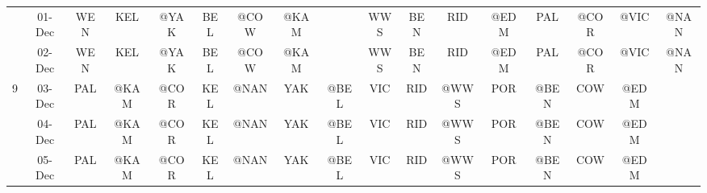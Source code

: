 \begin{table}[htbp]
\begin{tabular}{ccrrrrrrrrrrrrrrr}
          & 01-Dec & \multicolumn{1}{c}{WEN} & \multicolumn{1}{c}{KEL} & \multicolumn{1}{c}{@YAK} & \multicolumn{1}{c}{BEL} & \multicolumn{1}{c}{\cellcolor[rgb]{ .588,  .588,  .588}@COW} & \multicolumn{1}{c}{@KAM} &       & \multicolumn{1}{c}{\cellcolor[rgb]{ 1,  .6,  .8}WWS} & \multicolumn{1}{c}{BEN} & \multicolumn{1}{c}{\cellcolor[rgb]{ 1,  .6,  .8}RID} & \multicolumn{1}{c}{@EDM} & \multicolumn{1}{c}{PAL} & \multicolumn{1}{c}{@COR} & \multicolumn{1}{c}{\cellcolor[rgb]{ .588,  .588,  .588}@VIC} & \multicolumn{1}{c}{@NAN} \\
          & 02-Dec & \multicolumn{1}{c}{WEN} & \multicolumn{1}{c}{KEL} & \multicolumn{1}{c}{@YAK} & \multicolumn{1}{c}{BEL} & \multicolumn{1}{c}{\cellcolor[rgb]{ .588,  .588,  .588}@COW} & \multicolumn{1}{c}{@KAM} &       & \multicolumn{1}{c}{\cellcolor[rgb]{ 1,  .6,  .8}WWS} & \multicolumn{1}{c}{BEN} & \multicolumn{1}{c}{\cellcolor[rgb]{ 1,  .6,  .8}RID} & \multicolumn{1}{c}{@EDM} & \multicolumn{1}{c}{PAL} & \multicolumn{1}{c}{@COR} & \multicolumn{1}{c}{\cellcolor[rgb]{ .588,  .588,  .588}@VIC} & \multicolumn{1}{c}{@NAN} \\
    9     & 03-Dec & \multicolumn{1}{c}{PAL} & \multicolumn{1}{c}{@KAM} & \multicolumn{1}{c}{@COR} & \multicolumn{1}{c}{KEL} & \multicolumn{1}{c}{\cellcolor[rgb]{ .588,  .588,  .588}@NAN} & \multicolumn{1}{c}{YAK} & \multicolumn{1}{c}{@BEL} & \multicolumn{1}{c}{VIC} & \multicolumn{1}{c}{RID} & \multicolumn{1}{c}{\cellcolor[rgb]{ .588,  .588,  .588}@WWS} & \multicolumn{1}{c}{POR} & \multicolumn{1}{c}{@BEN} & \multicolumn{1}{c}{COW} & \multicolumn{1}{c}{\cellcolor[rgb]{ .588,  .588,  .588}@EDM} & \cellcolor[rgb]{ 1,  .6,  .8} \\
          & 04-Dec & \multicolumn{1}{c}{PAL} & \multicolumn{1}{c}{@KAM} & \multicolumn{1}{c}{@COR} & \multicolumn{1}{c}{KEL} & \multicolumn{1}{c}{\cellcolor[rgb]{ .588,  .588,  .588}@NAN} & \multicolumn{1}{c}{YAK} & \multicolumn{1}{c}{@BEL} & \multicolumn{1}{c}{VIC} & \multicolumn{1}{c}{RID} & \multicolumn{1}{c}{\cellcolor[rgb]{ .588,  .588,  .588}@WWS} & \multicolumn{1}{c}{POR} & \multicolumn{1}{c}{@BEN} & \multicolumn{1}{c}{COW} & \multicolumn{1}{c}{\cellcolor[rgb]{ .588,  .588,  .588}@EDM} & \cellcolor[rgb]{ 1,  .6,  .8} \\
          & 05-Dec & \multicolumn{1}{c}{PAL} & \multicolumn{1}{c}{@KAM} & \multicolumn{1}{c}{@COR} & \multicolumn{1}{c}{KEL} & \multicolumn{1}{c}{\cellcolor[rgb]{ .588,  .588,  .588}@NAN} & \multicolumn{1}{c}{YAK} & \multicolumn{1}{c}{@BEL} & \multicolumn{1}{c}{VIC} & \multicolumn{1}{c}{RID} & \multicolumn{1}{c}{\cellcolor[rgb]{ .588,  .588,  .588}@WWS} & \multicolumn{1}{c}{POR} & \multicolumn{1}{c}{@BEN} & \multicolumn{1}{c}{COW} & \multicolumn{1}{c}{\cellcolor[rgb]{ .588,  .588,  .588}@EDM} & \cellcolor[rgb]{ 1,  .6,  .8} \\

\end{tabular}
\end{table}
